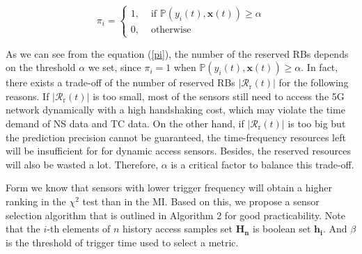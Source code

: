 \documentclass{SCIS2021}
\begin{document}
	\setlength\abovedisplayskip{-16pt}
	\begin{center}
		\begin{equation}
			\label{pi}
			\pi_{i}=\left\{\begin{array}{ll}1, & \text { if } \mathbb{P}(y_{i}(t), \bm{x}(t)) \geq \alpha \\0, & \text { otherwise }
			\end{array}\right.
		\end{equation}
	\end{center}
	\setlength\belowdisplayskip{-8pt}
	
	\par {\color{blue}As we can see from the equation (\ref{pi}), the number of the reserved RBs depends on the threshold $\alpha$ we set, since $\pi_{i}=1$ when $\mathbb{P}(y_{i}(t), \bm{x}(t)) \geq \alpha$. In fact, there exists a trade-off of the number of reserved RBs $\left|\mathcal{R}_\mathrm{r}(t)\right|$ for the following reasons. If $\left|\mathcal{R}_\mathrm{r}(t)\right|$ is too small, most of the sensors still need to access the 5G network dynamically with a high handshaking cost, which may violate the time demand of NS data and TC data. On the other hand, if $\left|\mathcal{R}_\mathrm{r}(t)\right|$ is too big but the prediction precision cannot be guaranteed, the time-frequency resources left will be insufficient for for dynamic access sensors. Besides, the reserved resources will also be wasted a lot. Therefore, $\alpha$ is a critical factor to balance this trade-off.}
	
	\par Form\cite{li2018predictive} we know that sensors with lower trigger frequency will obtain a higher ranking in the $\chi^{2}$ test than in the MI. Based on this, we propose a sensor selection algorithm that is outlined in Algorithm 2 for good practicability. Note that the $i$-th elements of $n$ history access samples set $\bm{H_{n}}$ is boolean set $\bm{h_{i}}$. And $\beta$ is the threshold of trigger time used to select a metric.
	
\end{document}
